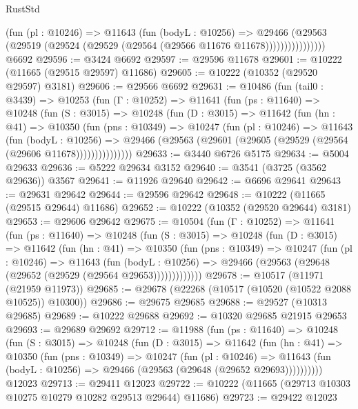 \begin{lexlean}{RustStd}
\begin{coremodule}
                    (fun (pl : @10246) =>
                    @11643
                      (fun (bodyL : @10256) =>
                      @29466
                        (@29563
                          (@29519 (@29524 (@29529 (@29564 (@29566 @11676 @11678))))))))))))))))
    @6692
@29596 := @3424 @6692
@29597 := @29596 @11678
@29601 := @10222 (@11665 (@29515 @29597) @11686)
@29605 := @10222 (@10352 (@29520 @29597) @3181)
@29606 := @29566 @6692
@29631 := @10486
    (fun (tail0 : @3439) =>
    @10253
      (fun (Γ : @10252) =>
      @11641
        (fun (ps : @11640) =>
        @10248
          (fun (S : @3015) =>
          @10248
            (fun (D : @3015) =>
            @11642
              (fun (hn : @41) =>
              @10350
                (fun (pns : @10349) =>
                @10247
                  (fun (pl : @10246) =>
                  @11643
                    (fun (bodyL : @10256) =>
                    @29466 (@29563 (@29601 (@29605 (@29529 (@29564 (@29606 @11678)))))))))))))))
@29633 := @3440 @6726 @5175
@29634 := @5004 @29633
@29636 := @5222 @29634 @3152
@29640 := @3541 (@3725 (@3562 @29636)) @3567
@29641 := @11926 @29640
@29642 := @6696 @29641
@29643 := @29631 @29642
@29644 := @29596 @29642
@29648 := @10222 (@11665 (@29515 @29644) @11686)
@29652 := @10222 (@10352 (@29520 @29644) @3181)
@29653 := @29606 @29642
@29675 := @10504
    (fun (Γ : @10252) =>
    @11641
      (fun (ps : @11640) =>
      @10248
        (fun (S : @3015) =>
        @10248
          (fun (D : @3015) =>
          @11642
            (fun (hn : @41) =>
            @10350
              (fun (pns : @10349) =>
              @10247
                (fun (pl : @10246) =>
                @11643
                  (fun (bodyL : @10256) =>
                  @29466 (@29563 (@29648 (@29652 (@29529 (@29564 @29653)))))))))))))
@29678 := @10517 (@11971 (@21959 @11973))
@29685 := @29678 (@22268 (@10517 (@10520 (@10522 @2088 @10525)) @10300))
@29686 := @29675 @29685
@29688 := @29527 (@10313 @29685)
@29689 := @10222 @29688
@29692 := @10320 @29685 @21915 @29653
@29693 := @29689 @29692
@29712 := @11988
    (fun (ps : @11640) =>
    @10248
      (fun (S : @3015) =>
      @10248
        (fun (D : @3015) =>
        @11642
          (fun (hn : @41) =>
          @10350
            (fun (pns : @10349) =>
            @10247
              (fun (pl : @10246) =>
              @11643 (fun (bodyL : @10256) => @29466 (@29563 (@29648 (@29652 @29693))))))))))
    @12023
@29713 := @29411 @12023
@29722 := @10222 (@11665 (@29713 @10303 @10275 @10279 @10282 @29513 @29644) @11686)
@29723 := @29422 @12023

\end{coremodule}
\end{lexlean}

